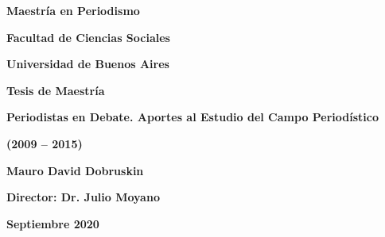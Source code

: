 



\ifPDF

\usepackage[hyphenation,homeoarchy,homeoarchywordcolor=orange, homeoarchycharcolor=orange,draft]{impnattypo}
\usepackage[allcolors=magenta, colorlinks, unicode]{hyperref}
\usepackage{easyReview}
\usepackage{hyperxmp}

	\else
	\ifBNPDF
	\usepackage[width=18truecm,height=25.5truecm,cam,center]{crop}
	\newcommand*\infofont[1]{\sf{\footnotesize #1 (salvatierra.msoledad@gmail.com)}}
	\crop[font=infofont]
	\usepackage[hidelinks, unicode]{hyperref}
	\usepackage{hyperxmp}
	
		\else
		\ifPNGEPUB
		\usepackage[hidelinks, unicode]{hyperref}
			\else
			\ifHTMLEPUB
			\usepackage[allcolors=blue,colorlinks,hyperindex=true,unicode]{hyperref}
			\fi
		\fi
	\fi
\fi


\frontmatter

\textbf{Maestría en Periodismo}

\textbf{Facultad de Ciencias Sociales}

\textbf{Universidad de Buenos Aires}

\textbf{Tesis de Maestría}

\textbf{Periodistas en Debate. Aportes al Estudio del Campo Periodístico}

\textbf{(2009 -- 2015)}

\textbf{Mauro David Dobruskin}

\textbf{Director: Dr. Julio Moyano}

\textbf{Septiembre 2020}

\textbf{\hfill\break
}



